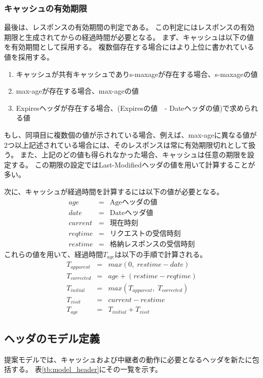 \documentclass{css}
\begin{document}
\subsubsection{キャッシュの有効期限}
\label{sec:expiration}
最後は、レスポンスの有効期間の判定である。
この判定にはレスポンスの有効期限と生成されてからの経過時間が必要となる。
まず、キャッシュは以下の値を有効期間として採用する。
複数個存在する場合にはより上位に書かれている値を採用する。
\begin{enumerate}
\item キャッシュが共有キャッシュでありs-maxageが存在する場合、s-maxageの値
\item max-ageが存在する場合、max-ageの値
\item Expiresヘッダが存在する場合、(Expiresの値　- Dateヘッダの値)で求められる値
\end{enumerate}
もし、同項目に複数個の値が示されている場合、例えば、max-ageに異なる値が2つ以上記述されている場合には、そのレスポンスは常に有効期限切れとして扱う。
また、上記のどの値も得られなかった場合、キャッシュは任意の期限を設定する。
この期限の設定ではLast-Modifiedヘッダの値を用いて計算することが多い。

次に、キャッシュが経過時間を計算するには以下の値が必要となる。
\begin{eqnarray*}
age & = & \mbox{Ageヘッダの値}\\
date & = & \mbox{Dateヘッダ値}\\
current & = & \mbox{現在時刻}\\
reqtime & = & \mbox{リクエストの受信時刻}\\
restime & = & \mbox{格納レスポンスの受信時刻}
\end{eqnarray*}
これらの値を用いて、経過時間$T_{age}$は以下の手順で計算される。
\begin{eqnarray*}
T_{apparent} & = & max(0,\;restime - date)\\
T_{corrected} & = & age + (restime - reqtime)\\
T_{initial} & = & max(T_{apparent},\;T_{corrected})\\
T_{visit} & = & current - restime\\
T_{age} & = & T_{initial} + T_{visit}
\end{eqnarray*}

\subsection{ヘッダのモデル定義}
提案モデルでは、キャッシュおよび中継者の動作に必要となるヘッダを新たに包括する。
表\ref{tb:model_header}にその一覧を示す。
\end{document}
